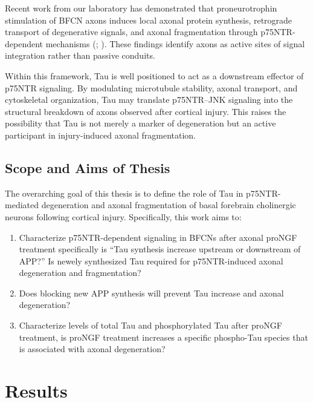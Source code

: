 \documentclass[
  letterpaper,
  DIV=11,
  numbers=noendperiod]{scrreprt}
\providecommand{\tightlist}{%
  \setlength{\itemsep}{0pt}\setlength{\parskip}{0pt}}
\begin{document}
Recent work from our laboratory has demonstrated that proneurotrophin
stimulation of BFCN axons induces local axonal protein synthesis,
retrograde transport of degenerative signals, and axonal fragmentation
through p75NTR-dependent mechanisms
(; ). These findings identify axons as active sites of signal
integration rather than passive conduits.

Within this framework, Tau is well positioned to act as a downstream
effector of p75NTR signaling. By modulating microtubule stability,
axonal transport, and cytoskeletal organization, Tau may translate
p75NTR--JNK signaling into the structural breakdown of axons observed
after cortical injury. This raises the possibility that Tau is not
merely a marker of degeneration but an active participant in
injury-induced axonal fragmentation.

\section{Scope and Aims of Thesis}\label{scope-and-aims-of-thesis}

The overarching goal of this thesis is to define the role of Tau in
p75NTR-mediated degeneration and axonal fragmentation of basal forebrain
cholinergic neurons following cortical injury. Specifically, this work
aims to:

\begin{enumerate}
\def\labelenumi{\arabic{enumi}.}
\tightlist
\item
  Characterize p75NTR-dependent signaling in BFCNs after axonal proNGF
  treatment specifically is ``Tau synthesis increase upstream or
  downstream of APP?'' Is newely synthesized Tau required for
  p75NTR-induced axonal degeneration and fragmentation?
\item
  Does blocking new APP synthesis will prevent Tau increase and axonal
  degeneration?
\item
  Characterize levels of total Tau and phosphorylated Tau after proNGF
  treatment, is proNGF treatment increases a specific phospho-Tau
  species that is associated with axonal degeneration?
\end{enumerate}


\chapter{Results}\label{results}
\end{document}
